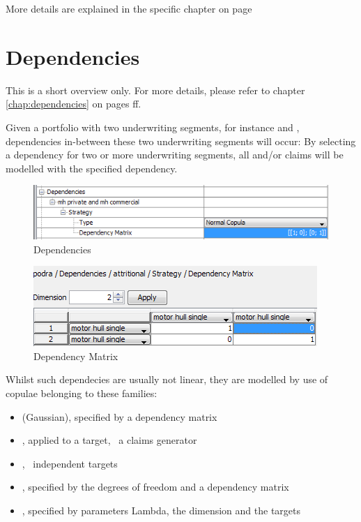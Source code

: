 More details are explained in the specific chapter on page~\pageref{chap:nl-reserves}\,\ff



\section{Dependencies} 
\label{sec:ClaimDependencies}

This is a short overview only. For more details, please refer to chapter \ref{chap:dependencies} on pages \pageref{chap:dependencies}ff.

Given a portfolio with two underwriting segments, for instance  and , dependencies in-between these two underwriting segments will occur: By selecting a dependency for two or more underwriting segments, all  and/or  claims will be modelled with the specified dependency.

\begin{figure}[htb]
	\centering
		\includegraphics[scale=0.6]{images/Dependency.png}
	\caption{Dependencies}
	\label{fig:Dependencies}
\end{figure}

\begin{figure}[htb]
	\centering
		\includegraphics[scale=0.6]{images/dependency_matrix.png}
	\caption{Dependency Matrix}
	\label{fig:Dependencies}
\end{figure}

Whilst such dependecies are usually not linear, 
they are modelled by use of copulae belonging to these families:
\begin{itemize}\tightitemize{0pt}
	\item  {} (Gaussian), specified by a dependency matrix
	\item  {}, applied to a target, \ie~a claims generator
	\item  {}, \ie~independent targets
	\item  {}, specified by the degrees of freedom and a dependency matrix
	\item  {}, specified by parameters Lambda, the dimension and the targets
\end{itemize} 

